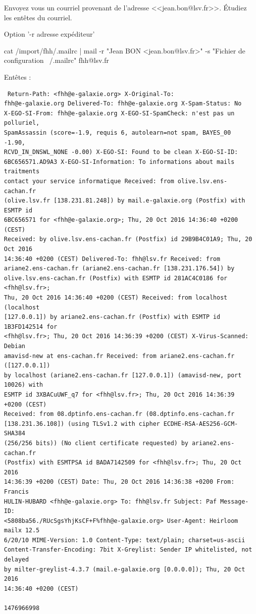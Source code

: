 \documentclass[11pt]{article}
\begin{document}
Envoyez vous un courriel provenant de l'adresse <<jean.bon@lsv.fr>>.
Étudiez les entêtes du courriel.

\begin{solution}

Option '-r adresse expéditeur'

cat /import/fhh/.mailrc | mail -r "Jean BON <jean.bon@lsv.fr>" -s "Fichier de
configuration ~/.mailrc" fhh@lsv.fr

Entêtes :

\begin{verbatim} Return-Path: <fhh@e-galaxie.org> X-Original-To:
fhh@e-galaxie.org Delivered-To: fhh@e-galaxie.org X-Spam-Status: No
X-EGO-SI-From: fhh@e-galaxie.org X-EGO-SI-SpamCheck: n'est pas un polluriel,
SpamAssassin (score=-1.9, requis 6, autolearn=not spam, BAYES_00 -1.90,
RCVD_IN_DNSWL_NONE -0.00) X-EGO-SI: Found to be clean X-EGO-SI-ID:
6BC656571.AD9A3 X-EGO-SI-Information: To informations about mails traitments
contact your service informatique Received: from olive.lsv.ens-cachan.fr
(olive.lsv.fr [138.231.81.248]) by mail.e-galaxie.org (Postfix) with ESMTP id
6BC656571 for <fhh@e-galaxie.org>; Thu, 20 Oct 2016 14:36:40 +0200 (CEST)
Received: by olive.lsv.ens-cachan.fr (Postfix) id 29B9B4C01A9; Thu, 20 Oct 2016
14:36:40 +0200 (CEST) Delivered-To: fhh@lsv.fr Received: from
ariane2.ens-cachan.fr (ariane2.ens-cachan.fr [138.231.176.54]) by
olive.lsv.ens-cachan.fr (Postfix) with ESMTP id 281AC4C0186 for <fhh@lsv.fr>;
Thu, 20 Oct 2016 14:36:40 +0200 (CEST) Received: from localhost (localhost
[127.0.0.1]) by ariane2.ens-cachan.fr (Postfix) with ESMTP id 1B3FD142514 for
<fhh@lsv.fr>; Thu, 20 Oct 2016 14:36:39 +0200 (CEST) X-Virus-Scanned: Debian
amavisd-new at ens-cachan.fr Received: from ariane2.ens-cachan.fr ([127.0.0.1])
by localhost (ariane2.ens-cachan.fr [127.0.0.1]) (amavisd-new, port 10026) with
ESMTP id 3XBACuUWF_q7 for <fhh@lsv.fr>; Thu, 20 Oct 2016 14:36:39 +0200 (CEST)
Received: from 08.dptinfo.ens-cachan.fr (08.dptinfo.ens-cachan.fr
[138.231.36.108]) (using TLSv1.2 with cipher ECDHE-RSA-AES256-GCM-SHA384
(256/256 bits)) (No client certificate requested) by ariane2.ens-cachan.fr
(Postfix) with ESMTPSA id BADA7142509 for <fhh@lsv.fr>; Thu, 20 Oct 2016
14:36:39 +0200 (CEST) Date: Thu, 20 Oct 2016 14:36:38 +0200 From: Francis
HULIN-HUBARD <fhh@e-galaxie.org> To: fhh@lsv.fr Subject: Paf Message-ID:
<5808ba56./RUcSgsYhjKsCF+F%fhh@e-galaxie.org> User-Agent: Heirloom mailx 12.5
6/20/10 MIME-Version: 1.0 Content-Type: text/plain; charset=us-ascii
Content-Transfer-Encoding: 7bit X-Greylist: Sender IP whitelisted, not delayed
by milter-greylist-4.3.7 (mail.e-galaxie.org [0.0.0.0]); Thu, 20 Oct 2016
14:36:40 +0200 (CEST)

1476966998 \end{verbatim} \end{solution}

\end{document}
